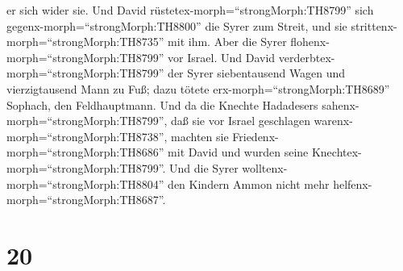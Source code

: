 er sich wider sie. Und David rüstetex-morph=``strongMorph:TH8799'' sich
gegenx-morph=``strongMorph:TH8800'' die Syrer zum Streit, und sie
strittenx-morph=``strongMorph:TH8735'' mit ihm.  Aber die
Syrer flohenx-morph=``strongMorph:TH8799'' vor Israel. Und David
verderbtex-morph=``strongMorph:TH8799'' der Syrer siebentausend Wagen
und vierzigtausend Mann zu Fuß; dazu tötete
erx-morph=``strongMorph:TH8689'' Sophach, den Feldhauptmann.
 Und da die Knechte Hadadesers
sahenx-morph=``strongMorph:TH8799'', daß sie vor Israel geschlagen
warenx-morph=``strongMorph:TH8738'', machten sie
Friedenx-morph=``strongMorph:TH8686'' mit David und wurden seine
Knechtex-morph=``strongMorph:TH8799''. Und die Syrer
wolltenx-morph=``strongMorph:TH8804'' den Kindern Ammon nicht mehr
helfenx-morph=``strongMorph:TH8687''.

\hypertarget{section-19}{%
\section{20}\label{section-19}}

